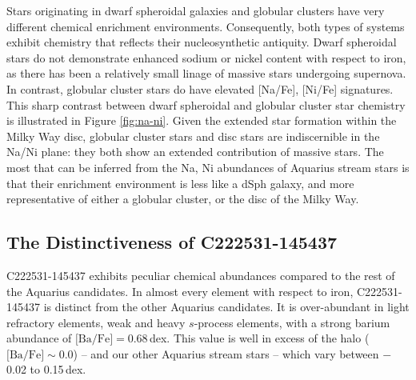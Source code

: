\documentclass{emulateapj}
\begin{document}
Stars originating in dwarf spheroidal galaxies and globular clusters have very different chemical enrichment environments. Consequently, both types of systems exhibit chemistry that reflects their nucleosynthetic antiquity. Dwarf spheroidal stars do not demonstrate enhanced sodium or nickel content with respect to iron, as there has been a relatively small linage of massive stars undergoing supernova. In contrast, globular cluster stars do have elevated [Na/Fe], [Ni/Fe] signatures. This sharp contrast between dwarf spheroidal and globular cluster star chemistry is illustrated in Figure \ref{fig:na-ni}. Given the extended star formation within the Milky Way disc, globular cluster stars and disc stars are indiscernible in the Na/Ni plane: they both show an extended contribution of massive stars. The most that can be inferred from the Na, Ni abundances of Aquarius stream stars is that their enrichment environment is less like a dSph galaxy, and more representative of either a globular cluster, or the disc of the Milky Way. 


\subsection{The Distinctiveness of C222531-145437}


C222531-145437 exhibits peculiar chemical abundances compared to the rest of the Aquarius candidates. In almost every element with respect to iron, {C222531-145437} is distinct from the other Aquarius candidates. It is over-abundant in light refractory elements, weak and heavy $s$-process elements, with a strong barium abundance of {$\mbox{[Ba/Fe]} = 0.68$\,dex}. This value is well in excess of the halo ({$\mbox{[Ba/Fe]} \sim 0.0$}) -- and our other Aquarius stream stars -- which vary between $-$0.02 to {0.15\,dex}. 
\end{document}
